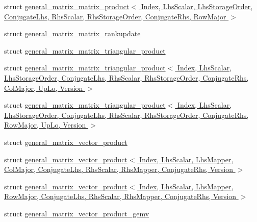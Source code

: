 \begin{DoxyCompactItemize}
\item 
struct \hyperlink{struct_eigen_1_1internal_1_1general__matrix__matrix__product_3_01_index_00_01_lhs_scalar_00_01_l7e45e4188e95a69de1c658ab4a83c882}{general\+\_\+matrix\+\_\+matrix\+\_\+product$<$ Index, Lhs\+Scalar, Lhs\+Storage\+Order, Conjugate\+Lhs, Rhs\+Scalar, Rhs\+Storage\+Order, Conjugate\+Rhs, Row\+Major $>$}
\item 
struct \hyperlink{struct_eigen_1_1internal_1_1general__matrix__matrix__rankupdate}{general\+\_\+matrix\+\_\+matrix\+\_\+rankupdate}
\item 
struct \hyperlink{struct_eigen_1_1internal_1_1general__matrix__matrix__triangular__product}{general\+\_\+matrix\+\_\+matrix\+\_\+triangular\+\_\+product}
\item 
struct \hyperlink{struct_eigen_1_1internal_1_1general__matrix__matrix__triangular__product_3_01_index_00_01_lhs_sc850fa7ad178159e52280c5aa1e0ab36e}{general\+\_\+matrix\+\_\+matrix\+\_\+triangular\+\_\+product$<$ Index, Lhs\+Scalar, Lhs\+Storage\+Order, Conjugate\+Lhs, Rhs\+Scalar, Rhs\+Storage\+Order, Conjugate\+Rhs, Col\+Major, Up\+Lo, Version $>$}
\item 
struct \hyperlink{struct_eigen_1_1internal_1_1general__matrix__matrix__triangular__product_3_01_index_00_01_lhs_scd4c70a4453dce53548fa7c3d3f42cf39}{general\+\_\+matrix\+\_\+matrix\+\_\+triangular\+\_\+product$<$ Index, Lhs\+Scalar, Lhs\+Storage\+Order, Conjugate\+Lhs, Rhs\+Scalar, Rhs\+Storage\+Order, Conjugate\+Rhs, Row\+Major, Up\+Lo, Version $>$}
\item 
struct \hyperlink{struct_eigen_1_1internal_1_1general__matrix__vector__product}{general\+\_\+matrix\+\_\+vector\+\_\+product}
\item 
struct \hyperlink{struct_eigen_1_1internal_1_1general__matrix__vector__product_3_01_index_00_01_lhs_scalar_00_01_l2767aff966c7bf3a7d425c9d340a95e8}{general\+\_\+matrix\+\_\+vector\+\_\+product$<$ Index, Lhs\+Scalar, Lhs\+Mapper, Col\+Major, Conjugate\+Lhs, Rhs\+Scalar, Rhs\+Mapper, Conjugate\+Rhs, Version $>$}
\item 
struct \hyperlink{struct_eigen_1_1internal_1_1general__matrix__vector__product_3_01_index_00_01_lhs_scalar_00_01_l24320a1e63993864008333cadda60258}{general\+\_\+matrix\+\_\+vector\+\_\+product$<$ Index, Lhs\+Scalar, Lhs\+Mapper, Row\+Major, Conjugate\+Lhs, Rhs\+Scalar, Rhs\+Mapper, Conjugate\+Rhs, Version $>$}
\item 
struct \hyperlink{struct_eigen_1_1internal_1_1general__matrix__vector__product__gemv}{general\+\_\+matrix\+\_\+vector\+\_\+product\+\_\+gemv}

\end{DoxyCompactItemize}
